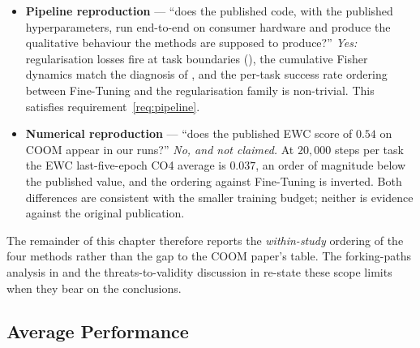 \begin{itemize}
    \item \textbf{Pipeline reproduction} --- ``does the
        published code, with the published hyperparameters,
        run end-to-end on consumer hardware and produce the
        qualitative behaviour the methods are supposed to
        produce?'' \emph{Yes:} regularisation losses fire at
        task boundaries (), the cumulative
        Fisher dynamics match the diagnosis of
        \citet{kirkpatrick2017ewc}, and the per-task success
        rate ordering between Fine-Tuning and the
        regularisation family is non-trivial. This satisfies
        requirement~\ref{req:pipeline}.
    \item \textbf{Numerical reproduction} --- ``does the
        published EWC score of $0.54$ on COOM appear in our
        runs?'' \emph{No, and not claimed.} At $20{,}000$
        steps per task the EWC last-five-epoch CO4 average
        is $0.037$, an order of magnitude below the
        published value, and the ordering against
        Fine-Tuning is inverted. Both differences are
        consistent with the smaller training budget; neither
        is evidence against the original publication.
\end{itemize}

The remainder of this chapter therefore reports the
\emph{within-study} ordering of the four methods rather
than the gap to the COOM paper's table. The
forking-paths analysis in  and the
threats-to-validity discussion in 
re-state these scope limits when they bear on the
conclusions.

\subsection{Average Performance}

\begin{table}[t]
    \centering
    \caption{Last-five-epoch mean training success rate per task, averaged
        across the four CO4 tasks. EWC reports mean $\pm$ standard
        deviation across three seeds; the other methods are single-seed.}
    \label{tab:avg_perf}
\end{table}

